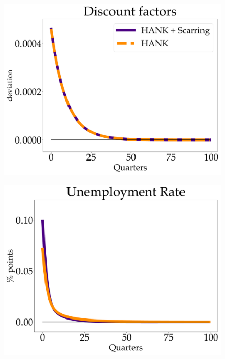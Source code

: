 \begin{figure}[htb]
    \centering %
\begin{minipage}{0.33\textwidth}
  \includegraphics[scale=.14]{text/chapter1/Figures/DiscFac_IPR}
  \label{fig:1}
\end{minipage}\hfil %
\begin{minipage}{0.33\textwidth}
  \includegraphics[scale=.14]{text/chapter1/Figures/U_IPR}
  \label{fig:2}
\end{minipage}\hfil %
\begin{minipage}{0.33\textwidth}

\end{minipage}
\end{figure}
